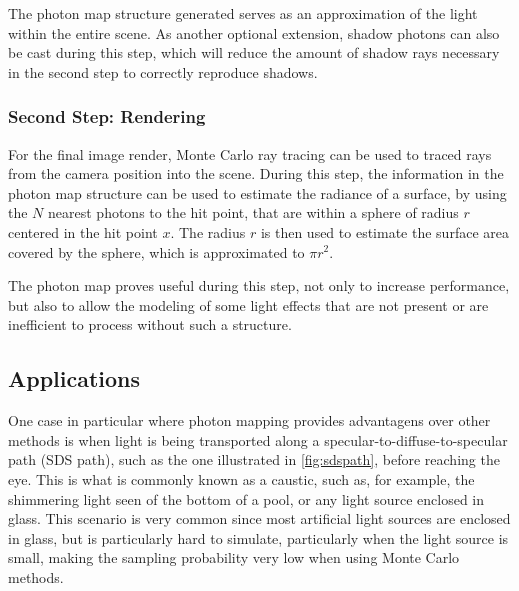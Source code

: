 \documentclass[main.tex]{subfiles}
\begin{document}
The photon map structure generated serves as an approximation of the light within the entire scene. As another optional extension, shadow photons can also be cast during this step, which will reduce the amount of shadow rays necessary in the second step to correctly reproduce shadows.



\subsubsection{Second Step: Rendering}

For the final image render, Monte Carlo ray tracing \cite{jensen2003monte} can be used to traced rays from the camera position into the scene. During this step, the information in the photon map structure can be used to estimate the radiance of a surface, by using the $N$ nearest photons to the hit point, that are within a sphere of radius $r$ centered in the hit point $x$. The radius $r$ is then used to estimate the surface area covered by the sphere, which is approximated to $\pi r^{2}$.

The photon map proves useful during this step, not only to increase performance, but also to allow the modeling of some light effects that are not present or are inefficient to process without such a structure.




\subsection{Applications}

One case in particular where photon mapping provides advantagens over other methods is when light is being transported along a specular-to-diffuse-to-specular path (SDS path), such as the one illustrated in \cref{fig:sdspath}, before reaching the eye. This is what is commonly known as a caustic, such as, for example, the shimmering light seen of the bottom of a pool, or any light source enclosed in glass. This scenario is very common since most artificial light sources are enclosed in glass, but is particularly hard to simulate, particularly when the light source is small, making the sampling probability very low when using Monte Carlo methods.
\end{document}
